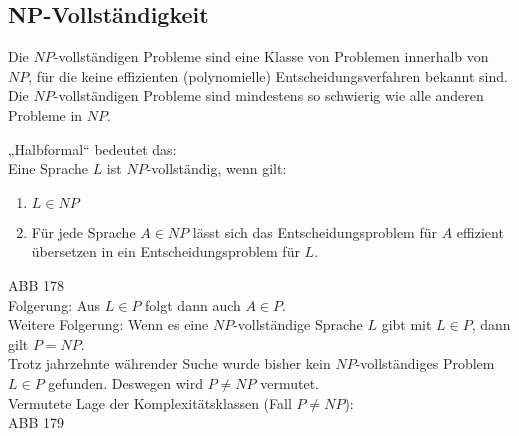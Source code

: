 \subsection{NP-Vollständigkeit}
Die $NP$-vollständigen Probleme sind eine Klasse von Problemen innerhalb von $NP$, für die keine effizienten (polynomielle) Entscheidungsverfahren bekannt sind. Die $NP$-vollständigen Probleme sind mindestens so schwierig wie alle anderen Probleme in $NP$.

„Halbformal“ bedeutet das:\\
Eine Sprache $L$ ist $NP$-vollständig, wenn gilt:
\begin{enumerate}
\item $L \in NP$
\item Für jede Sprache $A\in NP $ lässt sich das Entscheidungsproblem für $A$ effizient übersetzen in ein Entscheidungsproblem für $L$.
\end{enumerate}
ABB 178\\
Folgerung: Aus $L\in P$ folgt dann auch $A \in P$.\medskip\\
Weitere Folgerung: Wenn es eine $NP$-vollständige Sprache $L$ gibt mit $L\in P$, dann gilt $P=NP$.\medskip\\
Trotz jahrzehnte währender Suche wurde bisher kein $NP$-vollständiges Problem $L\in P$ gefunden. Deswegen wird $P\not = NP$ vermutet.\\
Vermutete Lage der Komplexitätsklassen (Fall $P \not = NP$):\\
ABB 179

